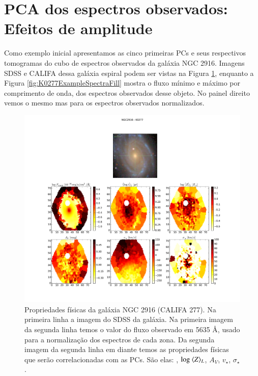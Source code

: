 \section{PCA dos espectros observados: Efeitos de amplitude}
\label{sec:PCAaplic:norm}

Como exemplo inicial apresentamos as cinco primeiras PCs e seus respectivos tomogramas do cubo de espectros observados
da galáxia NGC 2916. Imagens SDSS e CALIFA dessa galáxia espiral podem ser vistas na Figura \ref{fig:K0277apresent},
enquanto a Figura \ref{fig:K0277ExampleSpectraFill} mostra o fluxo mínimo e máximo por comprimento de onda, dos
espectros observados desse objeto. No painel direito vemos o mesmo mas para os espectros observados normalizados.

\begin{figure}
    \includegraphics[width=1.\textwidth]{figuras/K0277-apresent.pdf}
    \caption[Propriedades f\'isicas da gal\'axia NGC 2916 (CALIFA 277).]
    {Propriedades físicas da galáxia NGC 2916 (CALIFA 277). Na primeira linha a imagem do SDSS da galáxia. Na primeira
    imagem da segunda linha temos o valor do fluxo observado em 5635 \AA, usado para a normalização dos espectros de
    cada zona. Da segunda imagem da segunda linha em diante temos as propriedades físicas que serão correlacionadas com
    as PCs. São elas: , $\log\ \meanL{Z}$, $A_V$, $v_{\star}$, $\sigma_{\star}$.}
    \label{fig:K0277apresent}
\end{figure}

